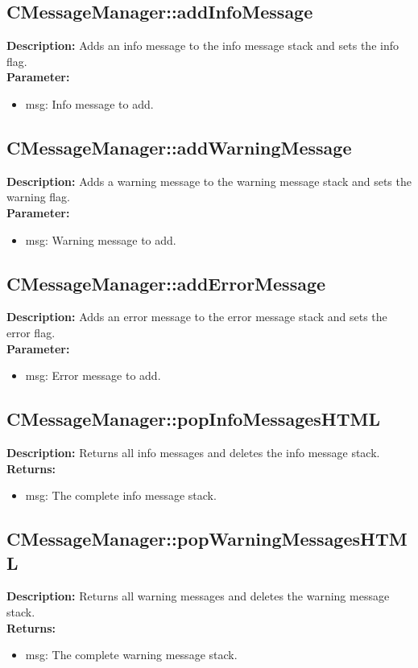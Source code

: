 \subsection{CMessageManager::addInfoMessage}
\textbf{Description:} Adds an info message to the info message stack and sets the info flag.\\
\textbf{Parameter:}
\begin{itemize}
\item msg: Info message to add.
\end{itemize}

\subsection{CMessageManager::addWarningMessage}
\textbf{Description:} Adds a warning message to the warning message stack and sets the warning flag.\\
\textbf{Parameter:}
\begin{itemize}
\item msg: Warning message to add.
\end{itemize}

\subsection{CMessageManager::addErrorMessage}
\textbf{Description:} Adds an error message to the error message stack and sets the error flag.\\
\textbf{Parameter:}
\begin{itemize}
\item msg: Error message to add.
\end{itemize}

\subsection{CMessageManager::popInfoMessagesHTML}
\textbf{Description:} Returns all info messages and deletes the info message stack.\\
\textbf{Returns:}
\begin{itemize}
\item msg: The complete info message stack.
\end{itemize}

\subsection{CMessageManager::popWarningMessagesHTML}
\textbf{Description:} Returns all warning messages and deletes the warning message stack.\\
\textbf{Returns:}
\begin{itemize}
\item msg: The complete warning message stack.
\end{itemize}

